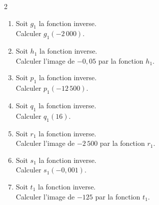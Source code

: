 {\begin{Exercice}
\begin{multicols}{2}
\begin{enumerate}[itemsep=1em]
\begin{minipage}[t]{\linewidth}
      Calculer l'image de $625$ par la fonction $f_1$.\end{minipage}
	\item \begin{minipage}[t]{\linewidth}Soit $g_1$ la fonction inverse.\\
      
      Calculer $g_1(-2\,000)$.\end{minipage}
	\item \begin{minipage}[t]{\linewidth}Soit $h_1$ la fonction inverse.\\
      
      Calculer l'image de $-0{,}05$ par la fonction $h_1$.\end{minipage}
	\item \begin{minipage}[t]{\linewidth}Soit $p_1$ la fonction inverse.\\
      
      Calculer $p_1(-12\,500)$.\end{minipage}
	\item \begin{minipage}[t]{\linewidth}Soit $q_1$ la fonction inverse.\\
      
      Calculer $q_1(16)$.\end{minipage}
	\item \begin{minipage}[t]{\linewidth}Soit $r_1$ la fonction inverse.\\
      
      Calculer l'image de $-2\,500$ par la fonction $r_1$.\end{minipage}
	\item \begin{minipage}[t]{\linewidth}Soit $s_1$ la fonction inverse.\\
      
      Calculer $s_1(-0{,}001)$.\end{minipage}
	\item \begin{minipage}[t]{\linewidth}Soit $t_1$ la fonction inverse.\\
      
      Calculer l'image de $-125$ par la fonction $t_1$.\end{minipage}
\end{enumerate}
\end{multicols}
\end{Exercice}

}
